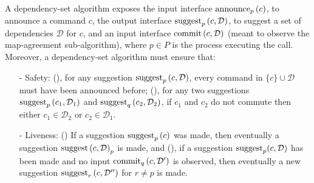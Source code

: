 A dependency-set algorithm exposes the input interface $\operatorname{announce}_p\left( c \right)$, to announce a command $c$, the output interface $\operatorname{suggest}_p \left( c,\mathcal{D}\right)$, to suggest a set of dependencies $\mathcal{D}$ for $c$, and an input interface $\operatorname{commit}\left( c,\mathcal{D} \right)$ (meant to observe the map-agreement sub-algorithm), where $p\in P$ is the process executing the call.
Moreover, a dependency-set algorithm must ensure that:
\begin{itemize}[noitemsep,nolistsep]
    \item[-] Safety: (), for any suggestion $\operatorname{suggest}_p \left( c,\mathcal{D}\right)$, every command in $\{c\}\cup \mathcal{D}$ must have been announced before; (), for any two suggestions $\operatorname{suggest}_p \left( c_1,\mathcal{D}_1\right)$ and $\operatorname{suggest}_q \left( c_2,\mathcal{D}_2\right)$, if $c_1$ and $c_2$ do not commute then either $c_1\in \mathcal{D}_2$ or $c_2 \in \mathcal{D}_1$.
    \item[-] Liveness: () If a suggestion $\operatorname{suggest}_p\left( c \right)$ was made, then eventually a suggestion $\operatorname{suggest}\left( c,\mathcal{D} \right)_p$ is made, and (), if a suggestion $\operatorname{suggest}_p(c,\mathcal{D})$ has been made and no input $\operatorname{commit}_q\left( c,\mathcal{D'} \right)$ is observed, then eventually a new suggestion $\operatorname{suggest}_r\left( c,\mathcal{D''} \right)$ for $r\neq p$ is made.
\end{itemize}

